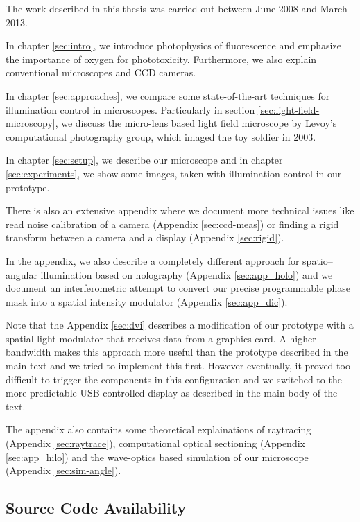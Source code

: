 \documentclass[oneside,a4paper,12pt,BCOR20mm,DIV14]{scrbook} %
\begin{document}
The work described in this thesis was carried out between June 2008
and March 2013.

In chapter \ref{sec:intro}, we introduce photophysics of fluorescence
and emphasize the importance of oxygen for phototoxicity. Furthermore,
we also explain conventional microscopes and CCD cameras.

In chapter \ref{sec:approaches}, we compare some state-of-the-art
techniques for illumination control in microscopes.  Particularly in
section \ref{sec:light-field-microscopy}, we discuss the micro-lens
based light field microscope by Levoy's computational photography
group, which imaged the toy soldier in 2003.

In chapter \ref{sec:setup}, we describe our microscope and in chapter
\ref{sec:experiments}, we show some images, taken with illumination
control in our prototype.

There is also an extensive appendix where we document more technical
issues like read noise calibration of a camera (Appendix
\ref{sec:ccd-meas}) or finding a rigid transform between a camera and
a display (Appendix \ref{sec:rigid}).

In the appendix, we also describe a completely different approach for
spatio--angular illumination based on holography (Appendix
\ref{sec:app_holo}) and we document an interferometric attempt to
convert our precise programmable phase mask into a spatial intensity
modulator (Appendix \ref{sec:app_dic}).

Note that the Appendix \ref{sec:dvi} describes a modification of our
prototype with a spatial light modulator that receives data from a
graphics card. A higher bandwidth makes this approach more useful than
the prototype described in the main text and we tried to implement
this first. However eventually, it proved too difficult to trigger the
components in this configuration and we switched to the more
predictable USB-controlled display as described in the main body of
the text.
 
The appendix also contains some theoretical explainations of
raytracing (Appendix \ref{sec:raytrace}), computational optical
sectioning (Appendix \ref{sec:app_hilo}) and the wave-optics based
simulation of our microscope (Appendix \ref{sec:sim-angle}).

\subsection*{Source Code Availability}
\end{document}
